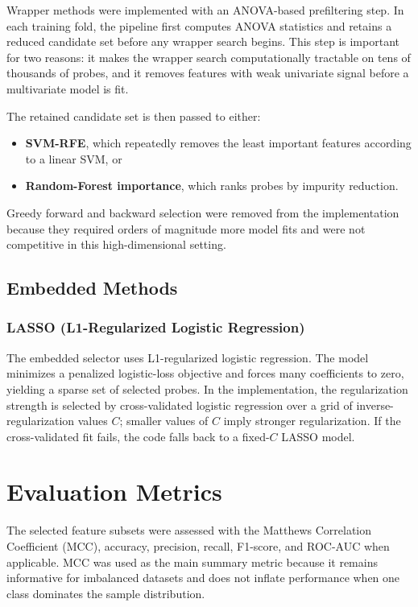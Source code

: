 Wrapper methods were implemented with an ANOVA-based prefiltering step. In each training fold, the pipeline first computes ANOVA statistics and retains a reduced candidate set before any wrapper search begins. This step is important for two reasons: it makes the wrapper search computationally tractable on tens of thousands of probes, and it removes features with weak univariate signal before a multivariate model is fit.

The retained candidate set is then passed to either:
\begin{itemize}
    \item \textbf{SVM-RFE}, which repeatedly removes the least important features according to a linear SVM, or
    \item \textbf{Random-Forest importance}, which ranks probes by impurity reduction.
\end{itemize}

Greedy forward and backward selection were removed from the implementation because they required orders of magnitude more model fits and were not competitive in this high-dimensional setting.

\subsection{Embedded Methods}

\subsubsection{LASSO (L1-Regularized Logistic Regression)}

The embedded selector uses L1-regularized logistic regression. The model minimizes a penalized logistic-loss objective and forces many coefficients to zero, yielding a sparse set of selected probes. In the implementation, the regularization strength is selected by cross-validated logistic regression over a grid of inverse-regularization values $C$; smaller values of $C$ imply stronger regularization. If the cross-validated fit fails, the code falls back to a fixed-$C$ LASSO model.

\section{Evaluation Metrics}

The selected feature subsets were assessed with the Matthews Correlation Coefficient (MCC), accuracy, precision, recall, F1-score, and ROC-AUC when applicable. MCC was used as the main summary metric because it remains informative for imbalanced datasets and does not inflate performance when one class dominates the sample distribution.

